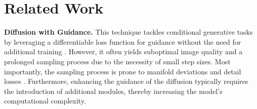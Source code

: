 \vspace{-6mm}


\section{Related Work}
\textbf{Diffusion with Guidance.} This technique tackles conditional generative tasks by leveraging a differentiable loss function for guidance without the need for additional training \cite{chung2024diffusionposteriorsamplinggeneral, shenoy2024gradientfreeclassifierguidancediffusion, bradley2024classifierfreeguidancepredictorcorrector}. However, it often yields suboptimal image quality and a prolonged sampling process due to the necessity of small step sizes.  Most importantly, the sampling process is prone to manifold deviations and detail losses \cite{yang2024guidancesphericalgaussianconstraint}. Furthermore, enhancing the guidance of the diffusion typically requires the introduction of additional modules, thereby increasing the model’s computational complexity. 


